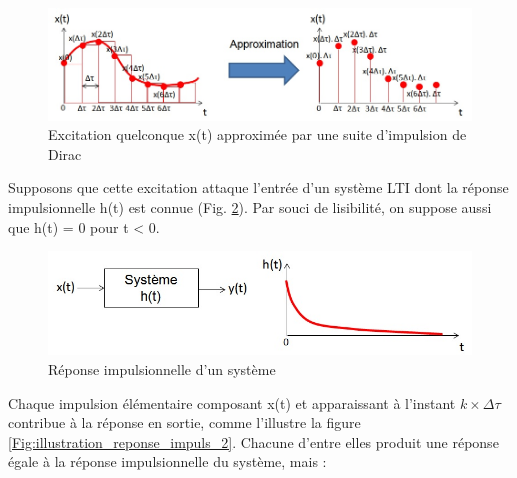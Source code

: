 	\begin{figure}[h!]
		\centering
		\includegraphics[scale=0.5]{images/Approx_excitation_Dirac.jpg} 
		\caption{Excitation quelconque x(t) approximée par une suite d'impulsion de Dirac}	
		\label{Fig:Approx_excitation_Dirac}
	\end{figure}
	Supposons que cette excitation attaque l'entrée d'un système LTI dont la réponse impulsionnelle h(t) est connue (Fig. \ref{Fig:reponse_impuls_illustration}). Par souci de lisibilité, on suppose aussi que h(t) = 0 pour t < 0.
	\begin{figure}[h!]
		\centering
		\includegraphics[scale=0.5]{images/reponse_impuls_illustration.jpg} 
		\caption{Réponse impulsionnelle d'un système}	
		\label{Fig:reponse_impuls_illustration}
	\end{figure}	
	
	Chaque impulsion élémentaire composant x(t) et apparaissant à l'instant
	$ k \times \Delta \tau $ contribue à la réponse en sortie, comme l'illustre la figure \ref{Fig:illustration_reponse_impuls_2}. Chacune d'entre elles produit une réponse égale à la réponse impulsionnelle du système, mais :
	
